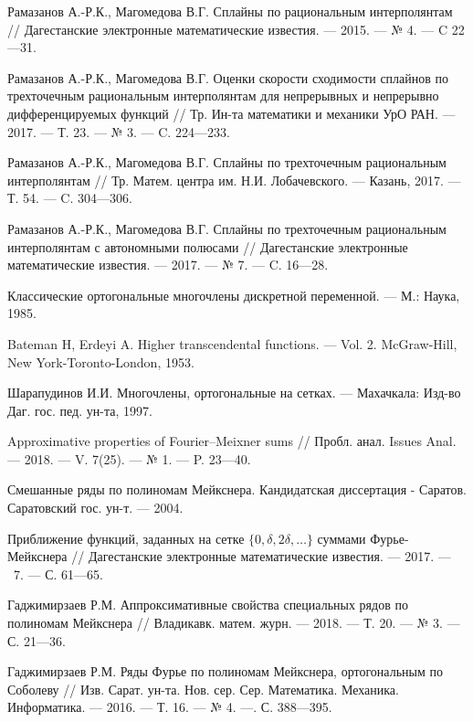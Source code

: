 \begin{thebibliography}{111}
Рамазанов А.-Р.К., Магомедова В.Г.  Сплайны по рациональным интерполянтам
// Дагестанские электронные математические известия. --- 2015. --- № 4. --- C 22---31.


Рамазанов А.-Р.К., Магомедова В.Г. Оценки скорости сходимости сплайнов
 по трехточечным рациональным интерполянтам
 для непрерывных и непрерывно дифференцируемых функций
// Тр. Ин-та математики и механики УрО РАН. --- 2017. --- Т. 23. --- № 3. --- C. 224---233.


Рамазанов А.-Р.К., Магомедова В.Г.
Сплайны по трехточечным рациональным интерполянтам
// Тр. Матем. центра им. Н.И. Лобачевского. --- Казань, 2017. --- Т. 54. ---  C. 304---306.


Рамазанов А.-Р.К., Магомедова В.Г. Сплайны по трехточечным рациональным
 интерполянтам с автономными полюсами
// Дагестанские электронные математические известия. --- 2017. --- № 7. --- C. 16---28.






 Классические ортогональные многочлены дискретной переменной. --- М.: Наука, 1985.

 {Bateman H, Erdeyi A.} Higher transcendental functions. --- Vol. 2. McGraw-Hill, New York-Toronto-London, 1953.


 {Шарапудинов И.И.} Многочлены, ортогональные на сетках. --- Махачкала: Изд-во Даг. гос. пед. ун-та, 1997.


 Approximative properties of Fourier–Meixner sums // Пробл. анал. Issues Anal. --- 2018. --- V. 7(25). --- № 1. --- P. 23---40.


 Смешанные ряды по полиномам Мейкснера. Кандидатская диссертация - Саратов. Саратовский гос. ун-т. --- 2004.

 Приближение функций, заданных на сетке $\{0, \delta, 2\delta, \ldots\}$ суммами Фурье-Мейкснера // Дагестанские электронные математические известия. --- 2017. --- \No\ 7. --- С. 61---65.


 {Гаджимирзаев Р.М.} Аппроксимативные свойства специальных рядов по полиномам Мейкснера // Владикавк. матем. журн. --- 2018. --- Т. 20. --- № 3. --- С. 21---36.

 {Гаджимирзаев Р.М.} Ряды Фурье по полиномам Мейкснера, ортогональным по Соболеву // Изв. Сарат. ун-та. Нов. сер. Сер. Математика. Механика. Информатика. --- 2016. --- Т. 16. --- № 4. ---. С. 388–--395.















\end{thebibliography}
